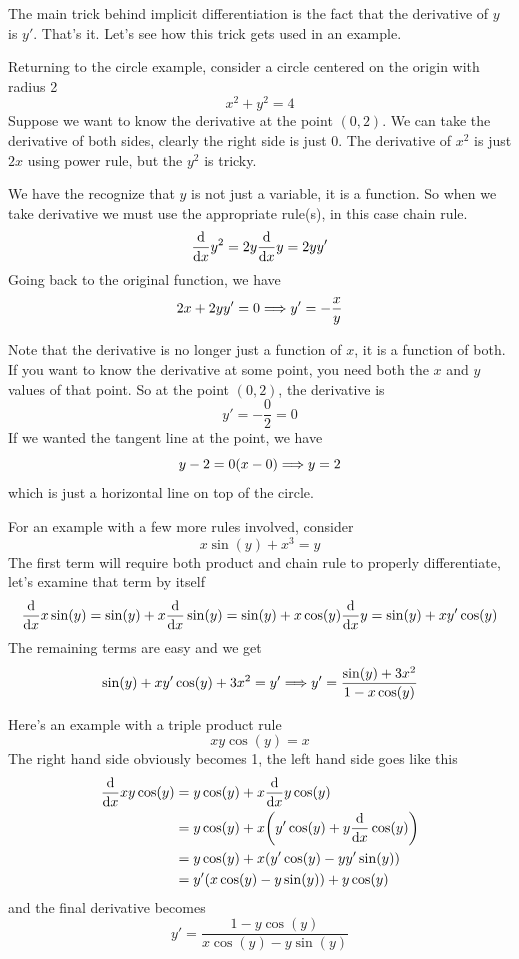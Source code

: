 The main trick behind implicit differentiation is the fact that the derivative of $y$ is $y'$. That's it. Let's see how this trick gets used in an example.

\begin{example}
	Returning to the circle example, consider a circle centered on the origin with radius 2
	\[ x^2 + y^2 = 4 \]
	Suppose we want to know the derivative at the point $(0, 2)$. We can take the derivative of both sides, clearly the right side is just 0. The derivative of $x^2$ is just $2x$ using power rule, but the $y^2$ is tricky. 
	
	We have the recognize that $y$ is not just a variable, it is a function. So when we take derivative we must use the appropriate rule(s), in this case chain rule.
	\[ \dv{x} y^2 = 2y \dv{x} y = 2y y' \]
	Going back to the original function, we have
	\[ 2x + 2y y' = 0 \Longrightarrow y' = -\frac{x}{y} \]
	
	Note that the derivative is no longer just a function of $x$, it is a function of both. If you want to know the derivative at some point, you need both the $x$ and $y$ values of that point. So at the point $(0, 2)$, the derivative is
	\[ y' = -\frac{0}{2} = 0 \]
	If we wanted the tangent line at the point, we have
	\[ y - 2 = 0(x - 0) \Longrightarrow y = 2 \]
	which is just a horizontal line on top of the circle.
\end{example}

\begin{example}
	For an example with a few more rules involved, consider
	\[ x \sin(y) + x^3 = y \]
	The first term will require both product and chain rule to properly differentiate, let's examine that term by itself
	\[ \dv{x} x \sin(y) = \sin(y) + x \dv{x} \sin(y) = \sin(y) + x \cos(y) \dv{x} y = \sin(y) + xy'\cos(y) \]
	The remaining terms are easy and we get
	\[ \sin(y) + xy'\cos(y) + 3x^2 = y' \Longrightarrow y' = \frac{\sin(y) + 3x^2}{1 - x\cos(y)} \]
\end{example}

\begin{example}
	Here's an example with a triple product rule
	\[ xy \cos(y) = x \]
	The right hand side obviously becomes 1, the left hand side goes like this
	\begin{align*}
		\dv{x} xy\cos(y) &= y \cos(y) + x \dv{x} y\cos(y) \\
		&= y \cos(y) + x \qty( y'\cos(y) + y \dv{x} \cos(y) ) \\
		&= y \cos(y) + x (y'\cos(y) - y y' \sin(y)) \\
		&= y' (x \cos(y) - y\sin(y)) + y\cos(y)
	\end{align*}
	and the final derivative becomes
	\[ y' = \frac{1 - y\cos(y)}{x \cos(y) - y \sin(y)} \]
\end{example}

